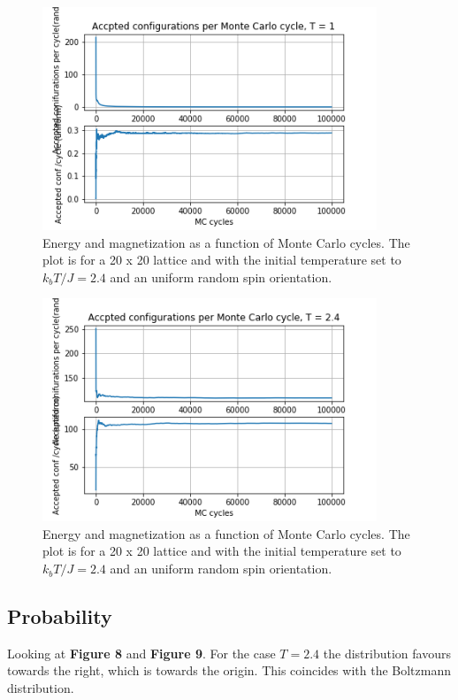 \documentclass[twoside,twocolumn]{article}
\begin{document}
\begin{figure}[h]
  \includegraphics[width= 10cm]{acceptedConfigsT1.png}
  \caption{Energy and magnetization as a function of Monte Carlo cycles. The plot is for a 20 x 20 lattice and with the initial temperature set to $k_bT/J = 2.4$ and an uniform random spin orientation.}
  \label{fig:boat6}
\end{figure}

\begin{figure}[h]
  \includegraphics[width= 10cm]{acceptedConfigsT2.png}
  \caption{Energy and magnetization as a function of Monte Carlo cycles. The plot is for a 20 x 20 lattice and with the initial temperature set to $k_bT/J = 2.4$ and an uniform random spin orientation.}
  \label{fig:boat7}
\end{figure}

\subsection{Probability}
Looking at \textbf{Figure 8} and \textbf{Figure 9}. For the case $T = 2.4$ the distribution favours towards the right, which is towards the origin. This coincides with the Boltzmann distribution.
\end{document}
